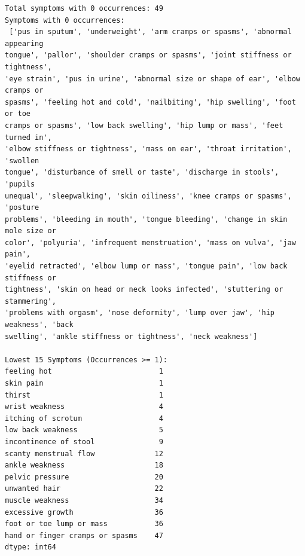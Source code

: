 \documentclass[11pt]{article}
\begin{document}
    \begin{Verbatim}[commandchars=\\\{\}]
Total symptoms with 0 occurrences: 49
Symptoms with 0 occurrences:
 ['pus in sputum', 'underweight', 'arm cramps or spasms', 'abnormal appearing
tongue', 'pallor', 'shoulder cramps or spasms', 'joint stiffness or tightness',
'eye strain', 'pus in urine', 'abnormal size or shape of ear', 'elbow cramps or
spasms', 'feeling hot and cold', 'nailbiting', 'hip swelling', 'foot or toe
cramps or spasms', 'low back swelling', 'hip lump or mass', 'feet turned in',
'elbow stiffness or tightness', 'mass on ear', 'throat irritation', 'swollen
tongue', 'disturbance of smell or taste', 'discharge in stools', 'pupils
unequal', 'sleepwalking', 'skin oiliness', 'knee cramps or spasms', 'posture
problems', 'bleeding in mouth', 'tongue bleeding', 'change in skin mole size or
color', 'polyuria', 'infrequent menstruation', 'mass on vulva', 'jaw pain',
'eyelid retracted', 'elbow lump or mass', 'tongue pain', 'low back stiffness or
tightness', 'skin on head or neck looks infected', 'stuttering or stammering',
'problems with orgasm', 'nose deformity', 'lump over jaw', 'hip weakness', 'back
swelling', 'ankle stiffness or tightness', 'neck weakness']

Lowest 15 Symptoms (Occurrences >= 1):
feeling hot                         1
skin pain                           1
thirst                              1
wrist weakness                      4
itching of scrotum                  4
low back weakness                   5
incontinence of stool               9
scanty menstrual flow              12
ankle weakness                     18
pelvic pressure                    20
unwanted hair                      22
muscle weakness                    34
excessive growth                   36
foot or toe lump or mass           36
hand or finger cramps or spasms    47
dtype: int64
    \end{Verbatim}

    \begin{center}
    \end{center}
    { \hspace*{\fill} \\}
    
\end{document}
